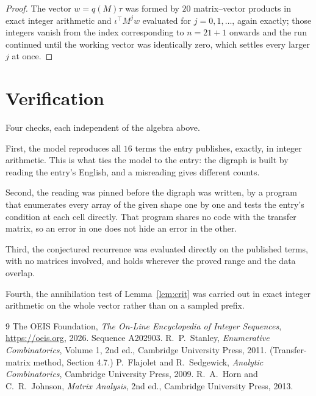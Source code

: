 \documentclass[11pt,a4paper]{article}
\theoremstyle{plain}
\theoremstyle{definition}
\begin{document}
\begin{proof}
The vector $w=q(M)\tau$ was formed by $20$ matrix--vector products in exact integer
arithmetic and $\iota^{\!\top}M^{j}w$ evaluated for $j=0,1,\dots$, again exactly; those
integers vanish from the index corresponding to $n=21+1$ onwards and the run continued
until the working vector was identically zero, which settles every larger $j$ at once.
\end{proof}

\section{Verification}

Four checks, each independent of the algebra above.

First, the model reproduces all $16$ terms the entry publishes, exactly, in integer
arithmetic. This is what ties the model to the entry: the digraph is built by reading the
entry's English, and a misreading gives different counts.

Second, the reading was pinned before the digraph was written, by a program that enumerates
every array of the given shape one by one and tests the entry's condition at each cell
directly. That program shares no code with the transfer matrix, so an error in one does not
hide an error in the other.

Third, the conjectured recurrence was evaluated directly on the published terms, with no
matrices involved, and holds wherever the proved range and the data overlap.

Fourth, the annihilation test of Lemma~\ref{lem:crit} was carried out in exact integer
arithmetic on the whole vector rather than on a sampled prefix.

\begin{thebibliography}{9}
 The OEIS Foundation, \emph{The On-Line Encyclopedia of Integer
Sequences}, \url{https://oeis.org}, 2026. Sequence A202903.
 R.~P.~Stanley, \emph{Enumerative Combinatorics}, Volume 1, 2nd ed.,
Cambridge University Press, 2011. (Transfer-matrix method, Section 4.7.)
 P.~Flajolet and R.~Sedgewick, \emph{Analytic Combinatorics}, Cambridge
University Press, 2009.
 R.~A.~Horn and C.~R.~Johnson, \emph{Matrix Analysis}, 2nd ed., Cambridge
University Press, 2013.
\end{thebibliography}
\end{document}
